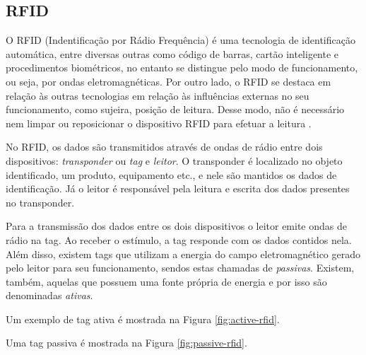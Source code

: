 \documentclass[
	article,			%
	11pt,				%
	oneside,			%
	a4paper,			%
	section=TITLE,		%
	subsection=TITLE,	%
	english,			%
	brazil,				%
	sumario=tradicional
	]{abntex2}
\begin{document}
\subsection{RFID}

O RFID (Indentificação por Rádio Frequência) é uma tecnologia de identificação automática, entre 
diversas outras como código de barras, cartão inteligente e procedimentos biométricos, no entanto 
se distingue pelo modo de funcionamento, ou seja, por ondas eletromagnéticas. 
Por outro lado, o RFID se destaca em relação às outras tecnologias em relação às 
influências externas no seu funcionamento, como sujeira, posição de leitura. Desse modo, não é 
necessário nem limpar ou reposicionar o dispositivo RFID para efetuar a leitura \cite{klaus2011}. 

No RFID, os dados são transmitidos através de ondas de rádio entre dois dispositivos: 
\textit{transponder} ou \textit{tag} e \textit{leitor}. O transponder é localizado no objeto 
identificado, um 
produto, equipamento etc., e nele são mantidos os dados de identificação. Já o leitor é responsável 
pela leitura e escrita dos dados presentes no transponder.

Para a transmissão dos dados entre os dois dispositivos o leitor emite ondas de rádio na tag. Ao 
receber o estímulo, a tag responde com os dados contidos nela. Além disso, existem tags que 
utilizam a energia do campo eletromagnético gerado pelo leitor para seu funcionamento, sendos estas 
chamadas de \textit{passivas}. Existem, também, aquelas que possuem uma fonte própria de energia e 
por isso são denominadas \textit{ativas}.

Um exemplo de tag ativa é mostrada na Figura \ref{fig:active-rfid}.


Uma tag passiva é mostrada na Figura \ref{fig:passive-rfid}.

\end{document}
